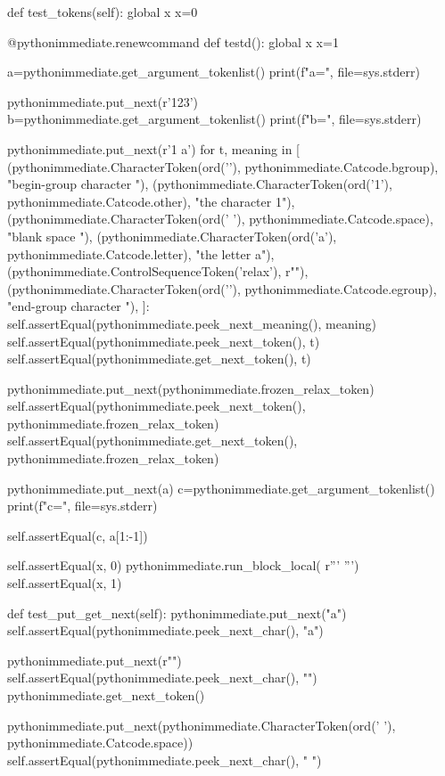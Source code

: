\documentclass[a5paper]{article}
\begin{document}
\begin{pycode}
	def test_tokens(self):
		global x
		x=0

		@pythonimmediate.renewcommand
		def testd():
			global x
			x=1

			a=pythonimmediate.get_argument_tokenlist()
			print(f"{a=}", file=sys.stderr)

			pythonimmediate.put_next(r'{123}')
			b=pythonimmediate.get_argument_tokenlist()
			print(f"{b=}", file=sys.stderr)

			pythonimmediate.put_next(r'{1 a\relax}')
			for t, meaning in [
					(pythonimmediate.CharacterToken(ord('{'), pythonimmediate.Catcode.bgroup), "begin-group character {"),
					(pythonimmediate.CharacterToken(ord('1'), pythonimmediate.Catcode.other), "the character 1"),
					(pythonimmediate.CharacterToken(ord(' '), pythonimmediate.Catcode.space), "blank space  "),
					(pythonimmediate.CharacterToken(ord('a'), pythonimmediate.Catcode.letter), "the letter a"),
					(pythonimmediate.ControlSequenceToken('relax'), r"\relax"),
					(pythonimmediate.CharacterToken(ord('}'), pythonimmediate.Catcode.egroup), "end-group character }"),
					]:
				self.assertEqual(pythonimmediate.peek_next_meaning(), meaning)
				self.assertEqual(pythonimmediate.peek_next_token(), t)
				self.assertEqual(pythonimmediate.get_next_token(), t)

			pythonimmediate.put_next(pythonimmediate.frozen_relax_token)
			self.assertEqual(pythonimmediate.peek_next_token(), pythonimmediate.frozen_relax_token)
			self.assertEqual(pythonimmediate.get_next_token(), pythonimmediate.frozen_relax_token)

			pythonimmediate.put_next(a)
			c=pythonimmediate.get_argument_tokenlist()
			print(f"{c=}", file=sys.stderr)

			self.assertEqual(c, a[1:-1])


		self.assertEqual(x, 0)
		pythonimmediate.run_block_local(
		r'''
		''')
		self.assertEqual(x, 1)

	def test_put_get_next(self):
		pythonimmediate.put_next("a")
		self.assertEqual(pythonimmediate.peek_next_char(), "a")

		pythonimmediate.put_next(r"\a")
		self.assertEqual(pythonimmediate.peek_next_char(), "")
		pythonimmediate.get_next_token()

		pythonimmediate.put_next(pythonimmediate.CharacterToken(ord(' '), pythonimmediate.Catcode.space))
		self.assertEqual(pythonimmediate.peek_next_char(), " ")


\end{pycode}
\end{document}
